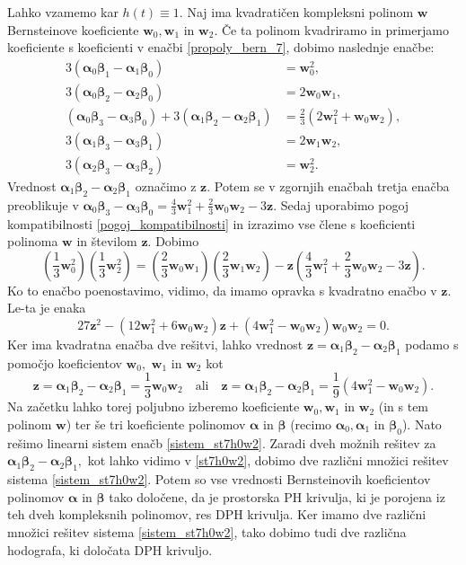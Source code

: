 \documentclass[12pt,a4paper,twoside]{article}
\theoremstyle{definition} %
\theoremstyle{plain} %
\theoremstyle{primerstyle}
\numberwithin{equation}{section}  %
\newcommand{\wV}{\mathbf{w}}
\newcommand{\zV}{\mathbf{z}}
\newcommand{\balpha}{\boldsymbol \alpha}
\newcommand{\bbeta}{\boldsymbol \beta}
\begin{document}
Lahko vzamemo kar $h(t)\equiv1.$ Naj ima kvadratičen kompleksni polinom $\wV$ Bernsteinove koeficiente $\wV_0,\wV_1$ in $\wV_2.$ Če ta polinom kvadriramo in primerjamo koeficiente s koeficienti v enačbi \eqref{propoly_bern_7}, dobimo naslednje enačbe:
\begin{align}
	3(\balpha_0\bbeta_1-\balpha_1\bbeta_0)&=\wV_0^2,\nonumber\\
	3(\balpha_0\bbeta_2-\balpha_2\bbeta_0)&=2\wV_0\wV_1,\nonumber\\
	(\balpha_0\bbeta_3-\balpha_3\bbeta_0)+3(\balpha_1\bbeta_2-\balpha_2\bbeta_1)&=\frac{2}{3}(2\wV_1^2+\wV_0\wV_2),\label{sistem_st7h0w2}\\
	3(\balpha_1\bbeta_3-\balpha_3\bbeta_1)&=2\wV_1\wV_2,\nonumber\\
	3(\balpha_2\bbeta_3-\balpha_3\bbeta_2)&=\wV_2^2.\nonumber
\end{align}
Vrednost $\balpha_1\bbeta_2-\balpha_2\bbeta_1$ označimo z $\zV.$ Potem se v zgornjih enačbah tretja enačba preoblikuje v $\balpha_0\bbeta_3-\balpha_3\bbeta_0=\frac{4}{3}\wV_1^2+\frac{2}{3}\wV_0\wV_2-3\zV.$ Sedaj uporabimo pogoj kompatibilnosti \eqref{pogoj_kompatibilnosti} in izrazimo vse člene s koeficienti polinoma $\wV$ in številom $\zV.$ Dobimo
\begin{equation*}
	\left(\frac{1}{3}\wV_0^2\right)\left(\frac{1}{3}\wV_2^2\right)=\left(\frac{2}{3}\wV_0\wV_1\right)\left(\frac{2}{3}\wV_1\wV_2\right)-\zV\left(\frac{4}{3}\wV_1^2+\frac{2}{3}\wV_0\wV_2-3\zV\right).
\end{equation*}
Ko to enačbo poenostavimo, vidimo, da imamo opravka s kvadratno enačbo v $\zV.$ Le-ta je enaka
\begin{equation*}
	27\zV^2-(12\wV_1^2+6\wV_0\wV_2)\zV+(4\wV_1^2-\wV_0\wV_2)\wV_0\wV_2=0.
\end{equation*}
Ker ima kvadratna enačba dve rešitvi, lahko vrednost $\zV=\balpha_1\bbeta_2-\balpha_2\bbeta_1$ podamo s pomočjo koeficientov $\wV_0,$ $\wV_1$ in $\wV_2$ kot
\begin{equation}
	\label{st7h0w2}
	\zV=\balpha_1\bbeta_2-\balpha_2\bbeta_1=\frac{1}{3}\wV_0\wV_2\quad\text{ali}\quad\zV=\balpha_1\bbeta_2-\balpha_2\bbeta_1=\frac{1}{9}(4\wV_1^2-\wV_0\wV_2).
\end{equation}
Na začetku lahko torej poljubno izberemo koeficiente $\wV_0,\wV_1$ in $\wV_2$ (in s tem polinom $\wV$) ter še tri koeficiente polinomov $\balpha$ in $\bbeta$ (recimo $\balpha_0,\balpha_1$ in $\bbeta_0$). Nato rešimo linearni sistem enačb \eqref{sistem_st7h0w2}. Zaradi dveh možnih rešitev za $\balpha_1\bbeta_2-\balpha_2\bbeta_1,$ kot lahko vidimo v \eqref{st7h0w2}, dobimo dve različni množici rešitev sistema \eqref{sistem_st7h0w2}. Potem so vse vrednosti Bernsteinovih koeficientov polinomov $\balpha$ in $\bbeta$ tako določene, da je prostorska PH krivulja, ki je porojena iz teh dveh kompleksnih polinomov, res DPH krivulja. Ker imamo dve različni množici rešitev sistema \eqref{sistem_st7h0w2}, tako dobimo tudi dve različna hodografa, ki določata DPH krivuljo.
\end{document}
